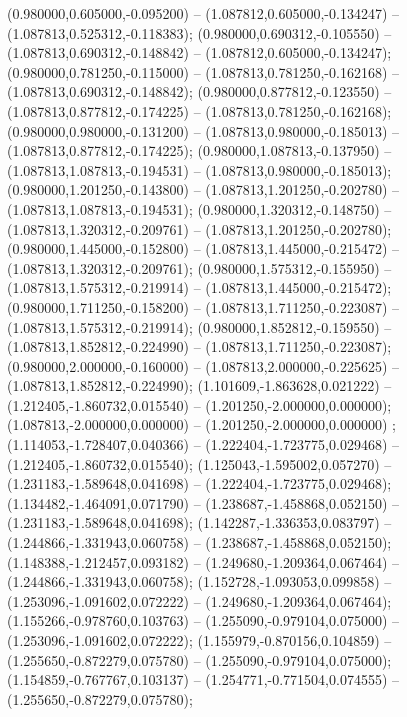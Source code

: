  (0.980000,0.605000,-0.095200) -- (1.087812,0.605000,-0.134247) -- (1.087813,0.525312,-0.118383);
 (0.980000,0.690312,-0.105550) -- (1.087813,0.690312,-0.148842) -- (1.087812,0.605000,-0.134247);
 (0.980000,0.781250,-0.115000) -- (1.087813,0.781250,-0.162168) -- (1.087813,0.690312,-0.148842);
 (0.980000,0.877812,-0.123550) -- (1.087813,0.877812,-0.174225) -- (1.087813,0.781250,-0.162168);
 (0.980000,0.980000,-0.131200) -- (1.087813,0.980000,-0.185013) -- (1.087813,0.877812,-0.174225);
 (0.980000,1.087813,-0.137950) -- (1.087813,1.087813,-0.194531) -- (1.087813,0.980000,-0.185013);
 (0.980000,1.201250,-0.143800) -- (1.087813,1.201250,-0.202780) -- (1.087813,1.087813,-0.194531);
 (0.980000,1.320312,-0.148750) -- (1.087813,1.320312,-0.209761) -- (1.087813,1.201250,-0.202780);
 (0.980000,1.445000,-0.152800) -- (1.087813,1.445000,-0.215472) -- (1.087813,1.320312,-0.209761);
 (0.980000,1.575312,-0.155950) -- (1.087813,1.575312,-0.219914) -- (1.087813,1.445000,-0.215472);
 (0.980000,1.711250,-0.158200) -- (1.087813,1.711250,-0.223087) -- (1.087813,1.575312,-0.219914);
 (0.980000,1.852812,-0.159550) -- (1.087813,1.852812,-0.224990) -- (1.087813,1.711250,-0.223087);
 (0.980000,2.000000,-0.160000) -- (1.087813,2.000000,-0.225625) -- (1.087813,1.852812,-0.224990);
 (1.101609,-1.863628,0.021222) -- (1.212405,-1.860732,0.015540) -- (1.201250,-2.000000,0.000000);
 (1.087813,-2.000000,0.000000) -- (1.201250,-2.000000,0.000000) ;
 (1.114053,-1.728407,0.040366) -- (1.222404,-1.723775,0.029468) -- (1.212405,-1.860732,0.015540);
 (1.125043,-1.595002,0.057270) -- (1.231183,-1.589648,0.041698) -- (1.222404,-1.723775,0.029468);
 (1.134482,-1.464091,0.071790) -- (1.238687,-1.458868,0.052150) -- (1.231183,-1.589648,0.041698);
 (1.142287,-1.336353,0.083797) -- (1.244866,-1.331943,0.060758) -- (1.238687,-1.458868,0.052150);
 (1.148388,-1.212457,0.093182) -- (1.249680,-1.209364,0.067464) -- (1.244866,-1.331943,0.060758);
 (1.152728,-1.093053,0.099858) -- (1.253096,-1.091602,0.072222) -- (1.249680,-1.209364,0.067464);
 (1.155266,-0.978760,0.103763) -- (1.255090,-0.979104,0.075000) -- (1.253096,-1.091602,0.072222);
 (1.155979,-0.870156,0.104859) -- (1.255650,-0.872279,0.075780) -- (1.255090,-0.979104,0.075000);
 (1.154859,-0.767767,0.103137) -- (1.254771,-0.771504,0.074555) -- (1.255650,-0.872279,0.075780);
